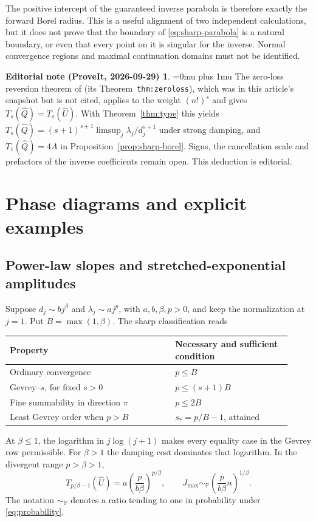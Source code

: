 \documentclass[11pt,a4paper]{article}
\numberwithin{equation}{section}
\theoremstyle{definition}
\theoremstyle{remark}
\theoremstyle{definition}
\newtheorem*{ednoteinner}{Editorial note (ProveIt, 2026-09-29)}
\newenvironment{ednote}{\begin{ednoteinner}\sloppy\Urlmuskip=0mu plus 1mu\relax}{\end{ednoteinner}}
\newcommand{\U}{\widehat U}
\newcommand{\Q}{\widehat Q}
\begin{document}
The positive intercept of the guaranteed inverse parabola is therefore
exactly the forward Borel radius. This is a useful alignment of two
independent calculations, but it does not prove that the boundary of
\eqref{eq:sharp-parabola} is a natural boundary, or even that every
point on it is singular for the inverse. Normal convergence regions
and maximal continuation domains must not be identified.

\begin{ednote}
The zero-loss reversion theorem of
 \cite{ed:swt} (its
Theorem~\texttt{thm:zeroloss}), which was in this article's snapshot but is
not cited, applies to the weight $(n!)^s$ and gives $T_s(\Q)=T_s(\U)$. With
Theorem~\ref{thm:type} this yields
$T_s(\Q)=(s+1)^{s+1}\limsup_j\lambda_j/d_j^{s+1}$ under strong damping, and
$T_1(\Q)=4A$ in Proposition~\ref{prop:sharp-borel}. Signs, the cancellation
scale and prefactors of the inverse coefficients remain open. This
deduction is editorial.
\end{ednote}

\section{Phase diagrams and explicit examples}
\label{sec:examples}

\subsection{Power-law slopes and stretched-exponential amplitudes}
Suppose $d_j\sim b j^\beta$ and $\lambda_j\sim a j^p$, with
$a,b,\beta,p>0$, and keep the normalization at $j=1$. Put
$B=\max(1,\beta)$. The sharp classification reads
\begin{center}
\begin{tabular}{@{}p{0.54\linewidth}p{0.38\linewidth}@{}}
\toprule
Property & Necessary and sufficient condition\\
\midrule
Ordinary convergence & $p\le B$\\[3pt]
Gevrey--$s$, for fixed $s>0$ & $p\le(s+1)B$\\[3pt]
Fine summability in direction $\pi$ & $p\le2B$\\[3pt]
Least Gevrey order when $p>B$ & $s_*=p/B-1$, attained\\
\bottomrule
\end{tabular}
\end{center}
At $\beta\le1$, the logarithm in $j\log(j+1)$ makes every equality
case in the Gevrey row permissible. For $\beta>1$ the damping cost
dominates that logarithm. In the divergent range $p>\beta>1$,
\begin{equation}
 T_{p/\beta-1}(\U)
 =a\left(\frac{p}{b\beta}\right)^{p/\beta},
 \qquad
 J_{\max}\sim_{\mathbb P}
       \left(\frac{p}{b\beta}n\right)^{1/\beta}.
 \label{eq:power-summary}
\end{equation}
The notation $\sim_{\mathbb P}$ denotes a ratio tending to one in
probability under \eqref{eq:probability}.
\end{document}
